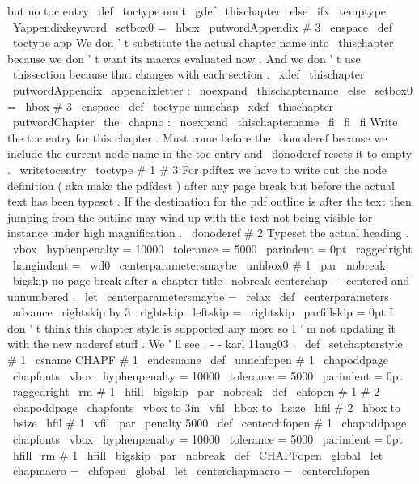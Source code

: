{{{but
no
toc
entry
\
def
\
toctype
{
omit
}
%
\
gdef
\
thischapter
{
}
%
\
else
\
ifx
\
temptype
\
Yappendixkeyword
\
setbox0
=
\
hbox
{
\
putwordAppendix
{
}
#
3
\
enspace
}
%
\
def
\
toctype
{
app
}
%
%
We
don
'
t
substitute
the
actual
chapter
name
into
\
thischapter
%
because
we
don
'
t
want
its
macros
evaluated
now
.
And
we
don
'
t
%
use
\
thissection
because
that
changes
with
each
section
.
%
\
xdef
\
thischapter
{
\
putwordAppendix
{
}
\
appendixletter
:
\
noexpand
\
thischaptername
}
%
\
else
\
setbox0
=
\
hbox
{
#
3
\
enspace
}
%
\
def
\
toctype
{
numchap
}
%
\
xdef
\
thischapter
{
\
putwordChapter
{
}
\
the
\
chapno
:
\
noexpand
\
thischaptername
}
%
\
fi
\
fi
\
fi
%
%
Write
the
toc
entry
for
this
chapter
.
Must
come
before
the
%
\
donoderef
because
we
include
the
current
node
name
in
the
toc
%
entry
and
\
donoderef
resets
it
to
empty
.
\
writetocentry
{
\
toctype
}
{
#
1
}
{
#
3
}
%
%
%
For
pdftex
we
have
to
write
out
the
node
definition
(
aka
make
%
the
pdfdest
)
after
any
page
break
but
before
the
actual
text
has
%
been
typeset
.
If
the
destination
for
the
pdf
outline
is
after
the
%
text
then
jumping
from
the
outline
may
wind
up
with
the
text
not
%
being
visible
for
instance
under
high
magnification
.
\
donoderef
{
#
2
}
%
%
%
Typeset
the
actual
heading
.
\
vbox
{
\
hyphenpenalty
=
10000
\
tolerance
=
5000
\
parindent
=
0pt
\
raggedright
\
hangindent
=
\
wd0
\
centerparametersmaybe
\
unhbox0
#
1
\
par
}
%
}
%
\
nobreak
\
bigskip
%
no
page
break
after
a
chapter
title
\
nobreak
}
%
centerchap
-
-
centered
and
unnumbered
.
\
let
\
centerparametersmaybe
=
\
relax
\
def
\
centerparameters
{
%
\
advance
\
rightskip
by
3
\
rightskip
\
leftskip
=
\
rightskip
\
parfillskip
=
0pt
}
%
I
don
'
t
think
this
chapter
style
is
supported
any
more
so
I
'
m
not
%
updating
it
with
the
new
noderef
stuff
.
We
'
ll
see
.
-
-
karl
11aug03
.
%
\
def
\
setchapterstyle
#
1
{
\
csname
CHAPF
#
1
\
endcsname
}
%
\
def
\
unnchfopen
#
1
{
%
\
chapoddpage
{
\
chapfonts
\
vbox
{
\
hyphenpenalty
=
10000
\
tolerance
=
5000
\
parindent
=
0pt
\
raggedright
\
rm
#
1
\
hfill
}
}
\
bigskip
\
par
\
nobreak
}
\
def
\
chfopen
#
1
#
2
{
\
chapoddpage
{
\
chapfonts
\
vbox
to
3in
{
\
vfil
\
hbox
to
\
hsize
{
\
hfil
#
2
}
\
hbox
to
\
hsize
{
\
hfil
#
1
}
\
vfil
}
}
%
\
par
\
penalty
5000
%
}
\
def
\
centerchfopen
#
1
{
%
\
chapoddpage
{
\
chapfonts
\
vbox
{
\
hyphenpenalty
=
10000
\
tolerance
=
5000
\
parindent
=
0pt
\
hfill
{
\
rm
#
1
}
\
hfill
}
}
\
bigskip
\
par
\
nobreak
}
\
def
\
CHAPFopen
{
%
\
global
\
let
\
chapmacro
=
\
chfopen
\
global
\
let
\
centerchapmacro
=
\
centerchfopen
}
%
}

